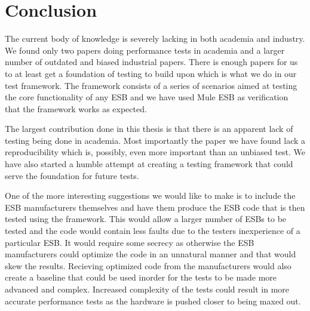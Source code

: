\section{Conclusion}

The current body of knowledge is severely lacking in both academia and industry. We found only two papers doing performance tests in academia and a larger number of outdated and biased industrial papers.
There is enough papers for us to at least get a foundation of testing to build upon which is what we do in our test framework. The framework consists of a series of scenarios aimed at testing the core functionality of any ESB and we have used Mule ESB as verification that the framework works as expected. 

The largest contribution done in this thesis is that there is an apparent lack of testing being done in academia. 
Most importantly the paper we have found \cite{Sanjay2011} lack a reproducibility which is, possibly, even more important than an unbiased test. 
We have also started a humble attempt at creating a testing framework that could serve the foundation for future tests. 

One of the more interesting suggestions we would like to make is to include the ESB manufacturers themselves and have them produce the ESB code that is then tested using the framework. 
This would allow a larger number of ESBs to be tested and the code would contain less faults due to the testers inexperience of a particular ESB. 
It would require some secrecy as otherwise the ESB manufacturers could optimize the code in an unnatural manner and that would skew the results. 
Recieving optimized code from the manufacturers would also create a baseline that could be used inorder for the tests to be made more advanced and complex.
Increased complexity of the tests could result in more accurate performance tests as the hardware is pushed closer to being maxed out.
